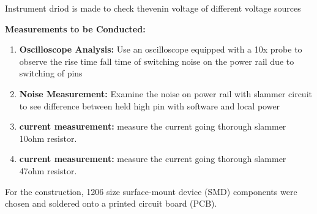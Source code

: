 \documentclass[a4paper,11pt]{article}%
\begin{document}
Instrument driod is made to check thevenin voltage of different voltage sources 

\textbf{Measurements to be Conducted:}

\begin{enumerate}
	\item \textbf{Oscilloscope Analysis:} Use an oscilloscope equipped with a 10x probe to observe the rise time fall time of switching noise on the power rail due to switching of pins
	\item \textbf{Noise Measurement:} Examine the noise on power rail with slammer circuit to see difference between held high pin with software and local power
	\item \textbf{current measurement:} measure the current going thorough slammer 10ohm resistor.
	\item \textbf{current measurement:} measure the current going thorough slammer 47ohm resistor.
\end{enumerate}

For the construction, 1206 size surface-mount device (SMD) components were chosen and soldered onto a printed circuit board (PCB).
\end{document}
